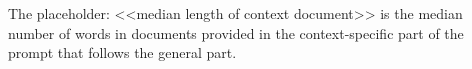 



The placeholder: <<median length of context document>> is the median number of words in documents provided in the context-specific part of the prompt that follows the general part.


